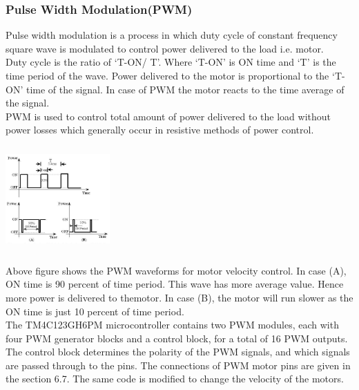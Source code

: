 \documentclass[a4paper,10pt,oneside]{article}
\begin{document}
			\subsubsection{\textbf{Pulse Width Modulation(PWM)}}
				Pulse width modulation is a process in which duty cycle of constant frequency square wave is modulated to control power delivered to the load i.e. motor. \\
				Duty cycle is the ratio of ‘T-ON/ T’. Where ‘T-ON’ is ON time and ‘T’ is the time period of the wave. Power delivered to the motor is proportional to the ‘T-ON’ time of the signal. In case of PWM the motor reacts to the time average of the signal. \\
				PWM is used to control total amount of power delivered to the load without power losses which generally occur in resistive methods of power control. 
				\begin{center}
					\includegraphics[width=4cm, height=4cm]{PWM}
				\end{center}
				Above figure shows the PWM waveforms for motor velocity control. In case (A), ON time is
				90 percent of time period. This wave has more average value. Hence more power is delivered to themotor. In case (B), the motor will run slower as the ON time is just 10 percent of time period. \\
				
				\hspace{-.7cm}
				The TM4C123GH6PM microcontroller contains two PWM modules, each with four PWM generator blocks and a control block, for a total of 16 PWM outputs. The control block determines the polarity of the PWM signals, and which signals are passed through to the pins. The connections of PWM motor pins are given in the section 6.7. The same code is modified to change the velocity of the motors.
				
\end{document}
